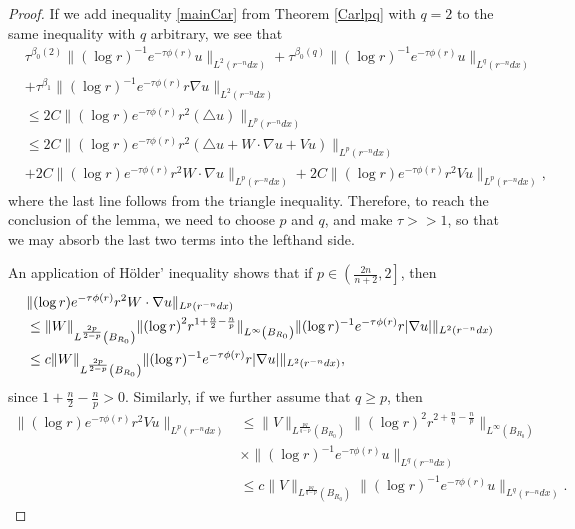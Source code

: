 \documentclass[11pt]{amsart}
\theoremstyle{plain}
\numberwithin{equation}{section}
\begin{document}
\begin{proof}
If we add inequality \eqref{mainCar} from Theorem \ref{Carlpq} with $q = 2$ to the same inequality with $q$ arbitrary, we see that
\begin{align}
&\tau^{{\beta}_0{\left( {2} \right) }} \|(\log r)^{-1} e^{-\tau \phi(r)}u\|_{L^2(r^{-n}dx)}
+\tau^{{\beta}_0{\left( {q} \right) }} \|(\log r)^{-1} e^{-\tau \phi(r)}u\|_{L^q(r^{-n}dx)} \nonumber \\
&+\tau^{{\beta}_1} \|(\log r )^{-1} e^{-\tau \phi(r)}r \nabla u\|_{L^2(r^{-n}dx)} \nonumber \\
&\le 2 C\|(\log r) e^{-\tau \phi(r)} r^2 (\triangle u)\|_{L^p(r^{-n} dx)} \nonumber \\
&\le 2 C\|(\log r) e^{-\tau \phi(r)} r^2 (\triangle u+ W\cdot \nabla u + V u)\|_{L^p(r^{-n} dx)} \nonumber \\
&+ 2 C\|(\log r) e^{-\tau \phi(r)} r^2 W\cdot \nabla u \|_{L^p(r^{-n} dx)}
+ 2 C\|(\log r) e^{-\tau \phi(r)} r^2 V u \|_{L^p(r^{-n} dx)},
\label{triIneq}
\end{align}
where the last line follows from the triangle inequality.
Therefore, to reach the conclusion of the lemma, we need to choose $p$ and $q$, and make $\tau >> 1$, so that we may absorb the last two terms into the lefthand side.

An application of H\"older' inequality shows that if $p \in {\left( {\frac{2n}{n+2}, 2} \right] }$, then
\begin{align}
& \|(\log r) e^{-\tau\phi(r)} r^2 W\cdot\nabla u\|_{L^p(r^{-n} dx)} \nonumber \medskip \\
&\le  \|W\|_{L^{\frac{2p}{2-p}}{\left( {B_{R_0}} \right) }} \|{\left( {\log r} \right) }^2 r^{1 + \frac n 2 - \frac n p}\|_{L^{\infty}{\left( {B_{R_0}} \right) }} \|(\log r)^{-1} e^{-\tau \phi(r)} r |\nabla u|\|_{L^2(r^{-n} dx)} \nonumber \\
&\le c \|W\|_{L^{\frac{2p}{2-p}}{\left( {B_{R_0}} \right) }} \|(\log r)^{-1} e^{-\tau \phi(r)} r |\nabla u|\|_{L^2(r^{-n} dx)},
\label{hod2}
\end{align}
since $1 + \frac n 2 - \frac n p > 0$.
Similarly, if we further assume that $q \ge p$, then
\begin{align}
\|(\log r) e^{-\tau \phi(r)} r^2 V u \|_{L^p(r^{-n} dx)}
&\le  \|V\|_{L^{\frac{pq}{q-p}}{\left( {B_{R_0}} \right) }} \|{\left( {\log r} \right) }^2 r^{2 + \frac n q - \frac n p}\|_{L^{\infty}{\left( {B_{R_0}} \right) }}
\nonumber \\ &\times\|(\log r)^{-1} e^{-\tau \phi(r)} u\|_{L^q(r^{-n} dx)} \nonumber \\
&\le c \|V\|_{L^{\frac{pq}{q-p}}{\left( {B_{R_0}} \right) }} \|(\log r)^{-1} e^{-\tau \phi(r)} u\|_{L^q(r^{-n} dx)}.
\label{hod3}
\end{align}


\end{proof}
\end{document}
